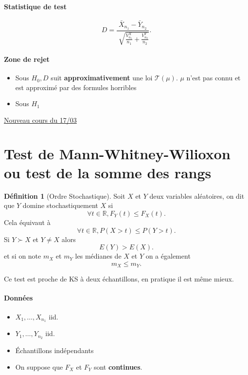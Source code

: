 \documentclass{article}
\theoremstyle{plain}%
\theoremstyle{definition}
\newtheorem{defn}{Définition}[section]
\theoremstyle{remark}
\begin{document}
\paragraph*{Statistique de test}
\[
    D = \frac{\bar{X}_{n_1} - \bar{Y}_{n_2}}{\sqrt[]{\frac{V_{n_1}^X}{n_1} + \frac{V_{n_2}^Y}{n_2}}}
.\]

\paragraph*{Zone de rejet}
\begin{itemize}
    \item Sous $ H_0, D $ suit \textbf{approximativement} une loi $ \mathcal{T}(\mu ) $. $ \mu  $ n'est pas connu et est approximé par des formules horribles
    \item Sous $ H_1 $ 
\end{itemize}

\underline{Nouveau cours du 17/03} \\ 

\section{Test de Mann-Whitney-Wilioxon ou test de la somme des rangs}

\begin{defn}[Ordre Stochastique]
    Soit $ X $ et $ Y $ deux variables aléatoires, on dit que $ Y $ domine stochastiquement $ X $ si 
    \[
        \forall t \in \mathbb{R}, F_Y(t) \leq F_X(t)
    .\]
    Cela équivaut à 
    \[
        \forall t \in \mathbb{R}, P(X>t) \leq P(Y > t)
    .\]
    Si $ Y\succ X $ et $ Y \neq X $ alors 
    \[
        E(Y) > E(X)
    .\]
    et si on note $ m_X $ et $ m_Y $ les médianes de $ X $ et $ Y $ on a également 
    \[
        m_X \leq m_Y
    .\]
\end{defn}

Ce test est proche de KS à deux échantillons, en pratique il est même mieux.
\paragraph*{Données}
\begin{itemize}
    \item $ X_1, \dots, X_{n_1}  $ iid. 
    \item $ Y_1, \dots, Y_{n_2}  $ iid.
    \item Échantillons indépendants
    \item On suppose que $ F_X $ et $ F_Y $ sont \textbf{continues}.
\end{itemize}
\end{document}
